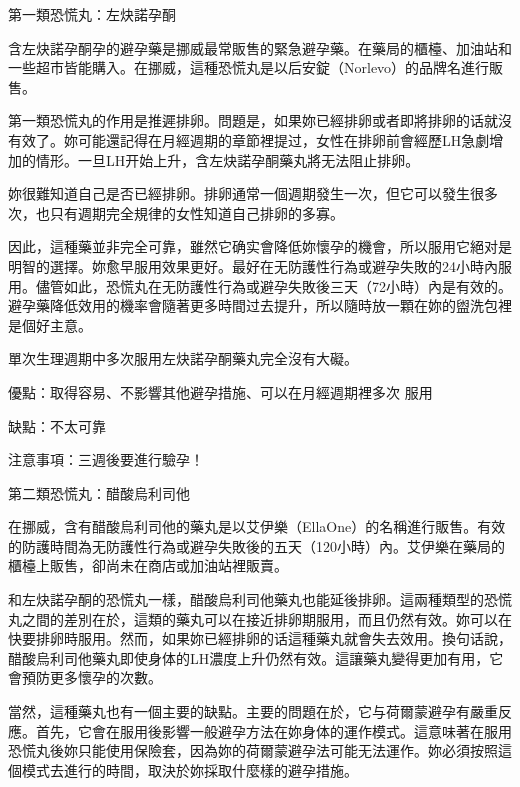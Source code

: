 \documentclass[12pt,UTF8]{ctexbook}
\begin{document}
第一類恐慌丸：左炔諾孕酮




含左炔諾孕酮孕的避孕藥是挪威最常販售的緊急避孕藥。在藥局的櫃檯、加油站和一些超市皆能購入。在挪威，這種恐慌丸是以后安錠（Norlevo）的品牌名進行販售。





第一類恐慌丸的作用是推遲排卵。問題是，如果妳已經排卵或者即將排卵的话就沒有效了。妳可能還記得在月經週期的章節裡提过，女性在排卵前會經歷LH急劇增加的情形。一旦LH开始上升，含左炔諾孕酮藥丸將无法阻止排卵。

妳很難知道自己是否已經排卵。排卵通常一個週期發生一次，但它可以發生很多次，也只有週期完全規律的女性知道自己排卵的多寡。

因此，這種藥並非完全可靠，雖然它确实會降低妳懷孕的機會，所以服用它絕对是明智的選擇。妳愈早服用效果更好。最好在无防護性行為或避孕失敗的24小時內服用。儘管如此，恐慌丸在无防護性行為或避孕失敗後三天（72小時）內是有效的。避孕藥降低效用的機率會隨著更多時間过去提升，所以隨時放一顆在妳的盥洗包裡是個好主意。

單次生理週期中多次服用左炔諾孕酮藥丸完全沒有大礙。



優點：取得容易、不影響其他避孕措施、可以在月經週期裡多次 服用

缺點：不太可靠

注意事項：三週後要進行驗孕！





第二類恐慌丸：醋酸烏利司他




在挪威，含有醋酸烏利司他的藥丸是以艾伊樂（EllaOne）的名稱進行販售。有效的防護時間為无防護性行為或避孕失敗後的五天（120小時）內。艾伊樂在藥局的櫃檯上販售，卻尚未在商店或加油站裡販賣。





和左炔諾孕酮的恐慌丸一樣，醋酸烏利司他藥丸也能延後排卵。這兩種類型的恐慌丸之間的差別在於，這類的藥丸可以在接近排卵期服用，而且仍然有效。妳可以在快要排卵時服用。然而，如果妳已經排卵的话這種藥丸就會失去效用。換句话說，醋酸烏利司他藥丸即使身体的LH濃度上升仍然有效。這讓藥丸變得更加有用，它會預防更多懷孕的次數。

當然，這種藥丸也有一個主要的缺點。主要的問題在於，它与荷爾蒙避孕有嚴重反應。首先，它會在服用後影響一般避孕方法在妳身体的運作模式。這意味著在服用恐慌丸後妳只能使用保險套，因為妳的荷爾蒙避孕法可能无法運作。妳必須按照這個模式去進行的時間，取決於妳採取什麼樣的避孕措施。
\end{document}
